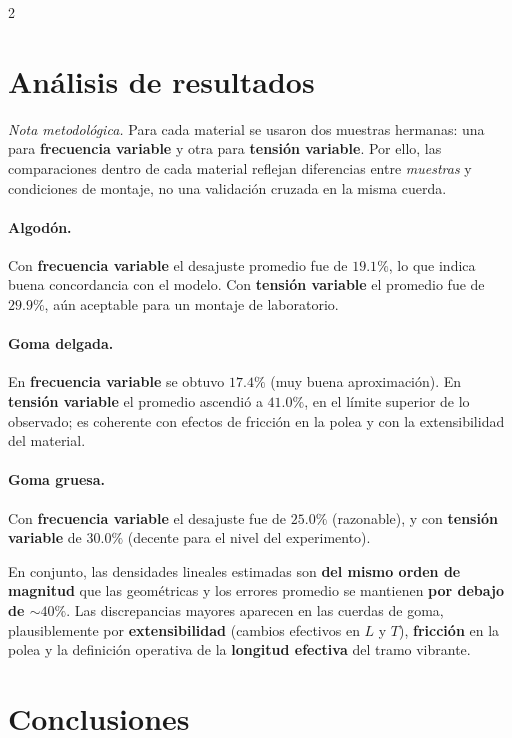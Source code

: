 \begin{multicols}{2}

\section*{Análisis de resultados}

\noindent\textit{Nota metodológica.} Para cada material se usaron dos muestras hermanas: una para \textbf{frecuencia variable} y otra para \textbf{tensión variable}. Por ello, las comparaciones dentro de cada material reflejan diferencias entre \emph{muestras} y condiciones de montaje, no una validación cruzada en la misma cuerda.

\paragraph{Algodón.} Con \textbf{frecuencia variable} el desajuste promedio fue de $19.1\%$, lo que indica buena concordancia con el modelo. Con \textbf{tensión variable} el promedio fue de $29.9\%$, aún aceptable para un montaje de laboratorio.

\paragraph{Goma delgada.} En \textbf{frecuencia variable} se obtuvo $17.4\%$ (muy buena aproximación). En \textbf{tensión variable} el promedio ascendió a $41.0\%$, en el límite superior de lo observado; es coherente con efectos de fricción en la polea y con la extensibilidad del material.

\paragraph{Goma gruesa.} Con \textbf{frecuencia variable} el desajuste fue de $25.0\%$ (razonable), y con \textbf{tensión variable} de $30.0\%$ (decente para el nivel del experimento).

\medskip
En conjunto, las densidades lineales estimadas son \textbf{del mismo orden de magnitud} que las geométricas y los errores promedio se mantienen \textbf{por debajo de $\sim40\%$}. Las discrepancias mayores aparecen en las cuerdas de goma, plausiblemente por \textbf{extensibilidad} (cambios efectivos en $L$ y $T$), \textbf{fricción} en la polea y la definición operativa de la \textbf{longitud efectiva} del tramo vibrante.



\section*{Conclusiones}


\end{multicols}
